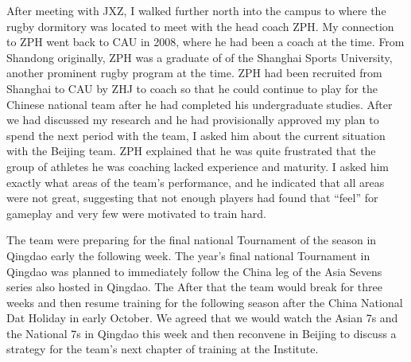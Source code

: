 

After meeting with JXZ, I walked further north into the campus to where the rugby dormitory was located to meet with the head coach ZPH. My connection to ZPH went back to CAU in 2008, where he had been a coach at the time. From Shandong originally, ZPH was a graduate of of the Shanghai Sports University, another prominent rugby program at the time.  ZPH had been recruited from Shanghai to CAU by ZHJ to coach so that he could continue to play for the Chinese national team after he had completed his undergraduate studies.  After we had discussed my research and he had provisionally approved my plan to spend the next period with the team, I asked him about the current situation with the Beijing team.  ZPH explained that he was quite frustrated that the group of athletes he was coaching lacked experience and maturity. I asked him exactly what areas of the team's performance, and he indicated that all areas were not great, suggesting that not enough players had found that ``feel'' for gameplay and very few were motivated to train hard.

The team were preparing for the final national Tournament of the season in Qingdao early the following week. The year's final national Tournament in Qingdao was planned to immediately follow the China leg of the Asia Sevens series also hosted in Qingdao. The After that the team would break for three weeks and then resume training for the following season after the China National Dat Holiday in early October.  We agreed that we would watch the Asian 7s and the National 7s in Qingdao this week and then reconvene in Beijing to discuss a strategy for the team's next chapter of training at the Institute.





